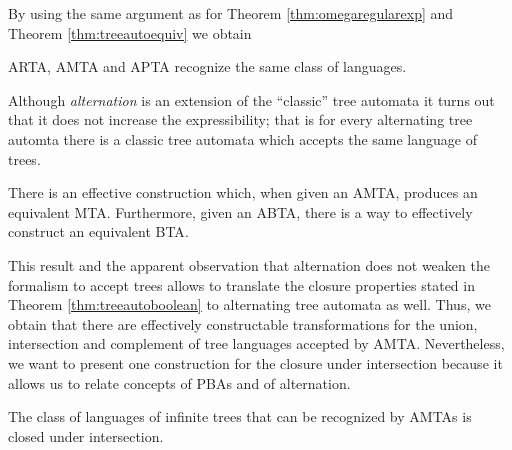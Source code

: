 By using the same argument as for Theorem 
\ref{thm:omegaregularexp} and Theorem \ref{thm:treeautoequiv} we obtain
\begin{theorem}
  \ac{ARTA}, \ac{AMTA} and \ac{APTA} recognize the same class of languages.
  \label{thm:atreeautoequiv}
\end{theorem}
Although \emph{alternation} is an extension of the \enquote{classic} tree 
automata it turns out that it does not increase the expressibility; that is
for every alternating tree automta there is a classic tree automata which 
accepts the same language of trees.
\begin{theorem}
  \cite[Theorem 1.2]{SimAltTreeAuto}
  There is an effective construction which, when given an \ac{AMTA}, produces 
  an equivalent \ac{MTA}. Furthermore, given an \ac{ABTA}, there is a way to 
  effectively construct an equivalent \ac{BTA}.
  \label{thm:treesimulation}
\end{theorem}
This result and the apparent observation that alternation does not weaken the 
formalism to accept trees allows to translate the closure properties stated in 
Theorem \ref{thm:treeautoboolean} to alternating tree automata as well. Thus, 
we obtain that there are effectively constructable transformations for the 
union, intersection and complement of tree languages accepted by \ac{AMTA}. 
Nevertheless, we want to present one construction for the closure under 
intersection because it allows us to relate concepts of \acp{PBA} and of
alternation.
\begin{corollary}
  The class of languages of infinite trees that can be recognized by \acp{AMTA}
  is closed under intersection.
  \label{cor:treeintersection}
\end{corollary}
